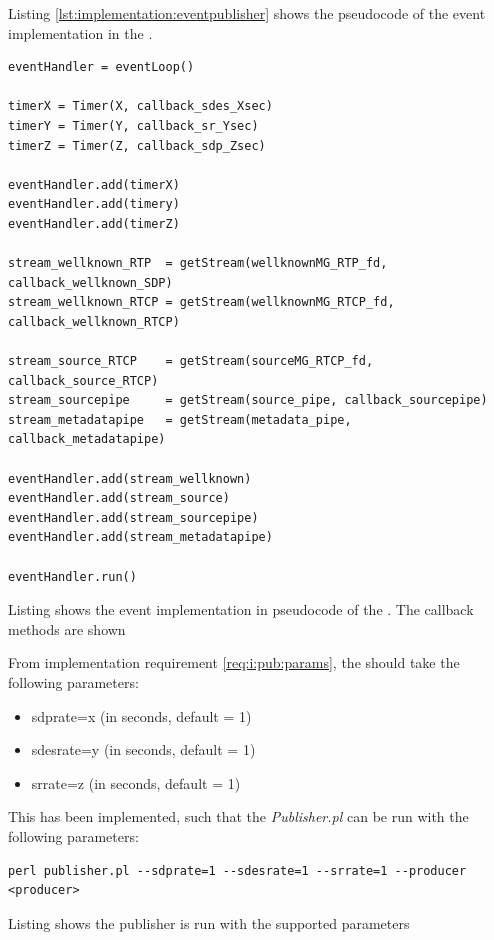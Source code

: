 Listing \ref{lst:implementation:eventpublisher} shows the pseudocode of the event implementation in the \pub{}.
\begin{listing}[H] 
\begin{verbatim}
eventHandler = eventLoop()
	
timerX = Timer(X, callback_sdes_Xsec)
timerY = Timer(Y, callback_sr_Ysec)
timerZ = Timer(Z, callback_sdp_Zsec)
	
eventHandler.add(timerX)
eventHandler.add(timery)
eventHandler.add(timerZ)
	
stream_wellknown_RTP  = getStream(wellknownMG_RTP_fd, callback_wellknown_SDP)
stream_wellknown_RTCP = getStream(wellknownMG_RTCP_fd, callback_wellknown_RTCP)

stream_source_RTCP    = getStream(sourceMG_RTCP_fd, callback_source_RTCP)
stream_sourcepipe     = getStream(source_pipe, callback_sourcepipe)
stream_metadatapipe   = getStream(metadata_pipe, callback_metadatapipe)	
	
eventHandler.add(stream_wellknown)
eventHandler.add(stream_source)
eventHandler.add(stream_sourcepipe)
eventHandler.add(stream_metadatapipe)
	
eventHandler.run()
\end{verbatim}
\caption{Listing shows the event implementation in pseudocode of the \pub{}. The callback methods are shown}
\label{lst:implementation:eventpublisher}
\end{listing}

From implementation requirement \ref{req:i:pub:params}, the \pub{} should take the following parameters:
\begin{itemize}
	\item sdprate=x (in seconds, default = 1)
	\item sdesrate=y (in seconds, default = 1)
	\item srrate=z (in seconds, default = 1)
\end{itemize}

This has been implemented, such that the \textit{Publisher.pl} can be run with the following parameters:
\begin{listing}[h] 
\begin{verbatim}
perl publisher.pl --sdprate=1 --sdesrate=1 --srrate=1 --producer <producer>
\end{verbatim}
\caption{Listing shows the publisher is run with the supported parameters}
\label{lst:implementation:parameterspublisher}
\end{listing}

